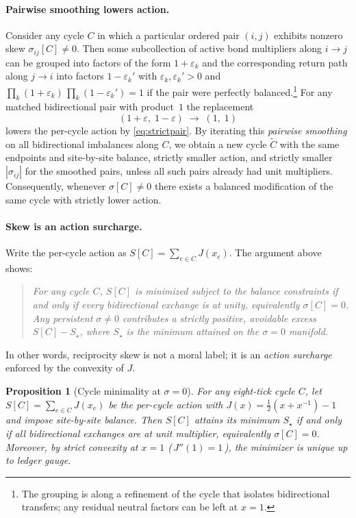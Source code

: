 \documentclass[11pt]{article}
\newtheorem{proposition}[theorem]{Proposition}
\begin{document}
\paragraph{Pairwise smoothing lowers action.}
Consider any cycle $C$ in which a particular ordered pair $(i,j)$ exhibits nonzero skew $\sigma_{ij}[C]\neq 0$. Then some subcollection of active bond multipliers along $i\to j$ can be grouped into factors of the form $1+\varepsilon_k$ and the corresponding return path along $j\to i$ into factors $1-\varepsilon_k'$ with $\varepsilon_k,\varepsilon_k'>0$ and $\prod_k(1+\varepsilon_k)\,\prod_k(1-\varepsilon_k')=1$ if the pair were perfectly balanced.\footnote{The grouping is along a refinement of the cycle that isolates bidirectional transfers; any residual neutral factors can be left at $x=1$.} For any matched bidirectional pair with product~$1$ the replacement
\[
(1+\varepsilon,\;1-\varepsilon)\;\longrightarrow\;(1,\;1)
\]
lowers the per-cycle action by \eqref{eq:strictpair}. By iterating this \emph{pairwise smoothing} on all bidirectional imbalances along $C$, we obtain a new cycle $\widetilde C$ with the same endpoints and site-by-site balance, strictly smaller action, and strictly smaller $|\sigma_{ij}|$ for the smoothed pairs, unless all such pairs already had unit multipliers. Consequently, whenever $\sigma[C]\neq 0$ there exists a balanced modification of the same cycle with strictly lower action.

\paragraph{Skew is an action surcharge.}
Write the per-cycle action as $S[C]=\sum_{e\in C}J(x_e)$. The argument above shows:

\begin{quote}
\emph{For any cycle $C$, $S[C]$ is minimized subject to the balance constraints if and only if every bidirectional exchange is at unity, equivalently $\sigma[C]=0$. Any persistent $\sigma\neq 0$ contributes a strictly positive, avoidable excess $S[C]-S_\star$, where $S_\star$ is the minimum attained on the $\sigma=0$ manifold.}
\end{quote}

In other words, reciprocity skew is not a moral label; it is an \emph{action surcharge} enforced by the convexity of $J$.

\begin{proposition}[Cycle minimality at $\sigma=0$]\label{prop:sigma-min}
For any eight-tick cycle $C$, let $S[C]=\sum_{e\in C}J(x_e)$ be the per-cycle action with $J(x)=\tfrac12(x+x^{-1})-1$ and impose site-by-site balance. Then $S[C]$ attains its minimum $S_\star$ \emph{if and only if} all bidirectional exchanges are at unit multiplier, equivalently $\sigma[C]=0$. Moreover, by strict convexity at $x=1$ (\,$J''(1)=1$\,), the minimizer is unique up to ledger gauge.
\end{proposition}
\end{document}
